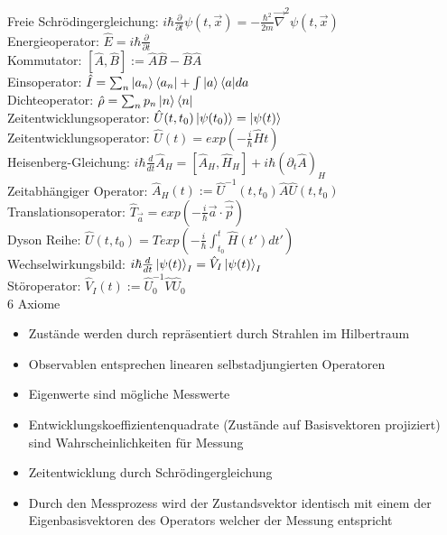 \documentclass{article}
\begin{document}
Freie Schr\"odingergleichung: $i \hbar \frac{\partial}{\partial t} \psi(t, \vec{x}) = -\frac{\hbar^2}{2m}\vec{\nabla}^2\psi(t, \vec{x}) $ \\

Energieoperator: $\hat{E} = i \hbar \frac{\partial}{\partial t} $ \\

Kommutator: $[\hat{A}, \hat{B}] := \hat{A}\hat{B} - \hat{B}\hat{A}$ \\

Einsoperator: $\hat{I}=\sum_n{\ket{a_n}\bra{a_n}} + \int{\ket{a}\bra{a}}da$ \\

Dichteoperator: $\hat{\rho}=\sum_n{p_n \ket{n}\bra{n}}$ \\

Zeitentwicklungsoperator: $\hat{U}(t, t_0)\ket{\psi(t_0)} = \ket{\psi(t)}$ \\

Zeitentwicklungsoperator: $\hat{U}(t) = exp(-\frac{i}{\hbar}\hat{H}t) $ \\

Heisenberg-Gleichung: $i \hbar \frac{d}{dt} \hat{A}_H = \left[ \hat{A}_H, \hat{H}_H \right] + i \hbar \left( \partial_t \hat{A} \right)_H $\\

Zeitabh\"angiger Operator: $\hat{A}_H(t) := \hat{U}^{-1}(t, t_0) \hat{A} \hat{U}(t, t_0)$ \\

Translationsoperator: $\hat{T}_{\vec{a}} = exp \left( - \frac{i}{\hbar} \vec{a} \cdot \hat{\vec{p}} \right)$ \\

Dyson Reihe:  $\hat{U}(t, t_0) = T exp\left(-\frac{i}{\hbar} \int_{t_0}^t{\hat{H}(t')}dt' \right)$ \\

Wechselwirkungsbild:  $i \hbar \frac{d}{dt} \ket{\psi(t)}_I = \hat{V}_I \ket{\psi(t)}_I$ \\

St\"oroperator: $\hat{V}_I(t) := \hat{U}_0^{-1} \hat{V} \hat{U}_0$ \\

6 Axiome \\ 
\begin{itemize}
\item Zust\"ande werden durch repr\"asentiert durch Strahlen im Hilbertraum
\item Observablen entsprechen linearen selbstadjungierten Operatoren
\item Eigenwerte sind m\"ogliche Messwerte
\item Entwicklungskoeffizientenquadrate (Zust\"ande auf Basisvektoren projiziert) sind Wahrscheinlichkeiten f\"ur Messung
\item Zeitentwicklung durch Schr\"odingergleichung
\item Durch den Messprozess wird der Zustandsvektor identisch mit einem der Eigenbasisvektoren des Operators welcher der Messung entspricht
\end{itemize}
\end{document}
